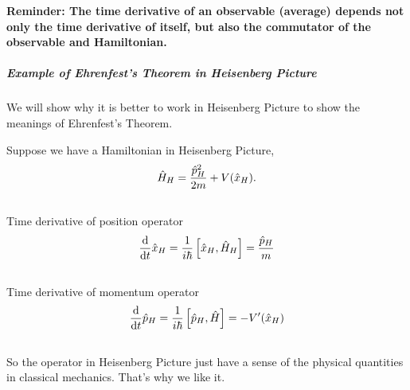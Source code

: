 \documentclass[letterpaper,10pt,english]{sphinxmanual}
\def\d{{\rm d}}
\begin{document}
\textbf{Reminder: The time derivative of an observable (average) depends not only the time derivative of itself, but also the commutator of the observable and Hamiltonian.}


\subparagraph{Example of Ehrenfest's Theorem in Heisenberg Picture}
\label{QuantumMechanics:example-of-ehrenfest-s-theorem-in-heisenberg-picture}
We will show why it is better to work in Heisenberg Picture to show the meanings of Ehrenfest's Theorem.

Suppose we have a Hamiltonian in Heisenberg Picture,
\begin{gather}
\begin{split}\hat H_H = \frac{\hat p _ H^2 }{2m} + V(\hat x _ H) .\end{split}\notag\\\begin{split}\end{split}\notag
\end{gather}
Time derivative of position operator
\begin{gather}
\begin{split}\frac{\d}{\d t} \hat x _ H = \frac{1}{i\hbar} \left[\hat x _ H, \hat H _ H \right ] = \frac{\hat p _ H}{m}\end{split}\notag\\\begin{split}\end{split}\notag
\end{gather}
Time derivative of momentum operator
\begin{gather}
\begin{split}\frac{\d}{\d t} \hat p_H = \frac{1}{i\hbar } \left[ \hat p _ H, \hat H \right] = - V'(\hat x_H)\end{split}\notag\\\begin{split}\end{split}\notag
\end{gather}
So the operator in Heisenberg Picture just have a sense of the physical quantities in classical mechanics. That's why we like it.
\end{document}
